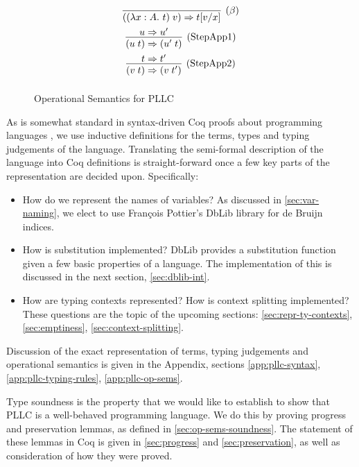 \documentclass[]{unswthesis}
\newcommand{\Francois}{Fran\frenchc{c}ois }
\newcommand{\lam}[1]{\lambda #1 \ldotp \,}
\newcommand{\app}[2]{(#1 \; #2)}
\newcommand{\steps}{\Rightarrow}
\let\frenchc\c
\let\c\texttt
\let\t\text
\begin{document}
\begin{figure}[h]
\caption{Operational Semantics for PLLC}
\label{pllc-op-sems}
\begin{displaymath}
\arraycolsep=1.4pt\def\arraystretch{2.2}
\begin{array}{cc}
\infer[(\beta)]{\app{(\lam{x : A} t)}{v} \steps t[v / x]}{} \\
\infer[\t{(StepApp1)}]{\app{u}{t} \steps \app{u'}{t}}{u \steps u'} \\
\infer[\t{(StepApp2)}]{\app{v}{t} \steps \app{v}{t'}}{t \steps t'} \\
\end{array}
\end{displaymath}
\end{figure}

As is somewhat standard in syntax-driven Coq proofs about programming languages \cite{pierce15}, we use inductive definitions for the terms, types and typing judgements of the language. Translating the semi-formal description of the language into Coq definitions is straight-forward once a few key parts of the representation are decided upon. Specifically:

\begin{itemize}
\item How do we represent the names of variables? As discussed in \cref{sec:var-naming}, we elect to use \Francois Pottier's DbLib library for de Bruijn indices.
\item How is substitution implemented? DbLib provides a substitution function given a few basic properties of a language. The implementation of this is discussed in the next section, \cref{sec:dblib-int}.
\item How are typing contexts represented? How is context splitting implemented? These questions are the topic of the upcoming sections: \cref{sec:repr-ty-contexts}, \cref{sec:emptiness}, \cref{sec:context-splitting}.
\end{itemize}

Discussion of the exact representation of terms, typing judgements and operational semantics is given in the Appendix, sections \cref{app:pllc-syntax}, \cref{app:pllc-typing-rules}, \cref{app:pllc-op-sems}.

Type soundness is the property that we would like to establish to show that PLLC is a well-behaved programming language. We do this by proving progress and preservation lemmas, as defined in \cref{sec:op-sems-soundness}. The statement of these lemmas in Coq is given in \cref{sec:progress} and \cref{sec:preservation}, as well as consideration of how they were proved.
\end{document}
